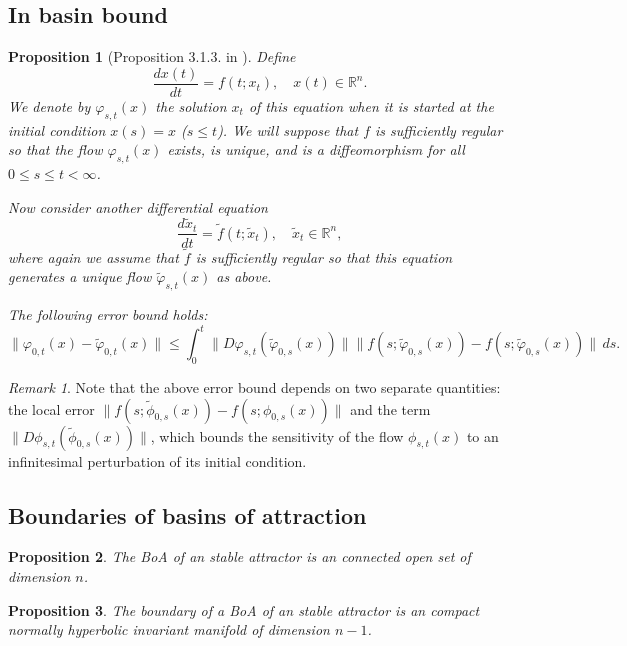 \documentclass{article}
\newtheorem{proposition}{Proposition}
\theoremstyle{definition} \newtheorem{definition}{Definition}
\theoremstyle{remark} \newtheorem{remark}{Remark}
\newcounter{ct}
\begin{document}
\subsection{In basin bound}\label{sec:313}
\begin{proposition}[Proposition 3.1.3. in \citep{vanhandel2007filtering}]\label{prop:313}
Define 
\[
\frac{d x(t)}{d t} = f(t; x_t), \quad x(t) \in \mathbb{R}^n.
\]
We denote by $\varphi_{s,t}(x)$ the solution $x_t$ of this equation when it is started at the initial condition $x(s) = x$ ($s \leq t$). We will suppose that $f$ is sufficiently regular so that the flow $\varphi_{s,t}(x)$ exists, is unique, and is a diffeomorphism for all $0 \leq s \leq t < \infty$.

Now consider another differential equation 
\[
\frac{d \tilde{x}_t}{d t} = \tilde{f}(t; \tilde{x}_t), \quad \tilde{x}_t \in \mathbb{R}^n,
\]
where again we assume that $\tilde{f}$ is sufficiently regular so that this equation generates a unique flow $\tilde{\varphi}_{s,t}(x)$ as above.


The following error bound holds:
\[
\|\varphi_{0,t}(x) - \tilde{\varphi}_{0,t}(x)\| \leq \int_0^t \|D\varphi_{s,t}(\tilde{\varphi}_{0,s}(x))\| \|f(s; \tilde{\varphi}_{0,s}(x)) - f(s; \tilde{\varphi}_{0,s}(x))\| \, ds.
\]
\end{proposition}


\begin{remark}\label{rem:313}
Note that the above error bound depends on two separate quantities: 
the local error \( \| f(s; \tilde{\phi}_{0,s}(x)) - f(s; \phi_{0,s}(x)) \| \) 
and 
the term \( \| D\phi_{s,t}(\tilde{\phi}_{0,s}(x)) \| \), which bounds the sensitivity of the flow \( \phi_{s,t}(x) \) to an infinitesimal perturbation of its initial condition.
\end{remark}


\subsection{Boundaries of basins of attraction}\label{sec:boaboundary}

\begin{proposition}
The BoA of an stable attractor is an connected open set of dimension $n$. %
\end{proposition}


\begin{proposition}
The boundary of a BoA of an stable attractor is an compact normally hyperbolic invariant manifold of dimension $n-1$. %
\end{proposition}
\end{document}
